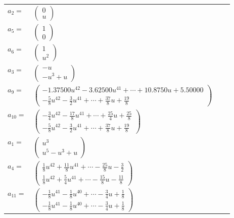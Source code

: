 \documentclass[1p]{elsarticle_modified}
\theoremstyle{definition}
\begin{document}
\begin{tabular}{m{7pt} m{180pt} m{7pt} m{180pt} }
\flushright $a_{2}=$&$\begin{pmatrix}0\\u\end{pmatrix}$ \\
\flushright $a_{5}=$&$\begin{pmatrix}1\\0\end{pmatrix}$ \\
\flushright $a_{6}=$&$\begin{pmatrix}1\\u^2\end{pmatrix}$ \\
\flushright $a_{3}=$&$\begin{pmatrix}- u\\- u^3+u\end{pmatrix}$ \\
\flushright $a_{9}=$&$\begin{pmatrix}-1.37500 u^{42}-3.62500 u^{41}+\cdots+10.8750 u+5.50000\\-\frac{5}{8} u^{42}-\frac{3}{2} u^{41}+\cdots+\frac{37}{8} u+\frac{19}{8}\end{pmatrix}$ \\
\flushright $a_{10}=$&$\begin{pmatrix}-\frac{3}{4} u^{42}-\frac{17}{8} u^{41}+\cdots+\frac{25}{4} u+\frac{25}{8}\\-\frac{5}{8} u^{42}-\frac{3}{2} u^{41}+\cdots+\frac{37}{8} u+\frac{19}{8}\end{pmatrix}$ \\
\flushright $a_{1}=$&$\begin{pmatrix}u^3\\u^5- u^3+u\end{pmatrix}$ \\
\flushright $a_{4}=$&$\begin{pmatrix}\frac{1}{8} u^{42}+\frac{11}{8} u^{41}+\cdots-\frac{25}{8} u-\frac{3}{2}\\\frac{1}{8} u^{42}+\frac{5}{4} u^{41}+\cdots-\frac{15}{8} u-\frac{11}{8}\end{pmatrix}$ \\
\flushright $a_{11}=$&$\begin{pmatrix}-\frac{1}{8} u^{41}-\frac{1}{8} u^{40}+\cdots-\frac{3}{4} u+\frac{1}{8}\\-\frac{1}{8} u^{41}-\frac{1}{8} u^{40}+\cdots-\frac{3}{4} u+\frac{1}{8}\end{pmatrix}$ \\

\end{tabular}
\end{document}
